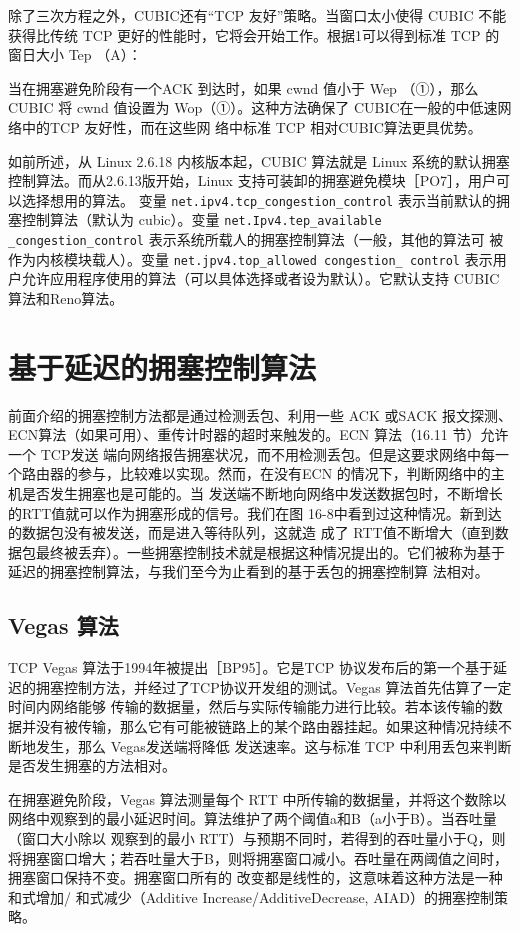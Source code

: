 除了三次方程之外，CUBIC还有“TCP 友好”策略。当窗口太小使得 CUBIC 不能获得比传统 TCP 更好的性能时，它将会开始工作。根据1可以得到标准 TCP 的窗日大小 Tep （A）：

当在拥塞避免阶段有一个ACK 到达时，如果 cwnd 值小于 Wep （①），那么 CUBIC 将 cwnd 值设置为 Wop（①）。这种方法确保了 CUBIC在一般的中低速网络中的TCP 友好性，而在这些网
络中标准 TCP 相对CUBIC算法更具优势。

如前所述，从 Linux 2.6.18 内核版本起，CUBIC 算法就是 Linux 系统的默认拥塞控制算法。而从2.6.13版开始，Linux 支持可装卸的拥塞避免模块［PO7］，用户可以选择想用的算法。
变量 \verb|net.ipv4.tcp_congestion_control| 表示当前默认的拥塞控制算法（默认为 cubic）。变量 \verb|net.Ipv4.tep_available _congestion_control| 表示系统所载人的拥塞控制算法（一般，其他的算法可
被作为内核模块载人）。变量 \verb|net.jpv4.top_allowed congestion_ control| 表示用户允许应用程序使用的算法（可以具体选择或者设为默认）。它默认支持 CUBIC 算法和Reno算法。

\section{基于延迟的拥塞控制算法}
前面介绍的拥塞控制方法都是通过检测丢包、利用一些 ACK 或SACK 报文探测、ECN算法（如果可用）、重传计时器的超时来触发的。ECN 算法（16.11 节）允许一个 TCP发送
端向网络报告拥塞状况，而不用检测丢包。但是这要求网络中每一个路由器的参与，比较难以实现。然而，在没有ECN 的情况下，判断网络中的主机是否发生拥塞也是可能的。当
发送端不断地向网络中发送数据包时，不断增长的RTT值就可以作为拥塞形成的信号。我们在图 16-8中看到过这种情况。新到达的数据包没有被发送，而是进入等待队列，这就造
成了 RTT值不断增大（直到数据包最终被丢弃）。一些拥塞控制技术就是根据这种情况提出的。它们被称为基于延迟的拥塞控制算法，与我们至今为止看到的基于丢包的拥塞控制算
法相对。

\subsection{Vegas 算法}
TCP Vegas 算法于1994年被提出［BP95］。它是TCP 协议发布后的第一个基于延迟的拥塞控制方法，并经过了TCP协议开发组的测试。Vegas 算法首先估算了一定时间内网络能够
传输的数据量，然后与实际传输能力进行比较。若本该传输的数据并没有被传输，那么它有可能被链路上的某个路由器挂起。如果这种情况持续不断地发生，那么 Vegas发送端将降低
发送速率。这与标准 TCP 中利用丢包来判断是否发生拥塞的方法相对。

在拥塞避免阶段，Vegas 算法测量每个 RTT 中所传输的数据量，并将这个数除以网络中观察到的最小延迟时间。算法维护了两个阈值a和B（a小于B）。当吞吐量（窗口大小除以
观察到的最小 RTT）与预期不同时，若得到的吞吐量小于Q，则将拥塞窗口增大；若吞吐量大于B，则将拥塞窗口减小。吞吐量在两阈值之间时，拥塞窗口保持不变。拥塞窗口所有的
改变都是线性的，这意味着这种方法是一种和式增加/ 和式减少（Additive Increase/AdditiveDecrease, AIAD）的拥塞控制策略。

